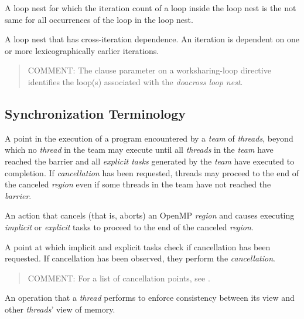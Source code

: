 \glossarydefstart
A loop nest for which the iteration count of a loop inside the loop nest is the
not same for all occurrences of the loop in the loop nest.
\glossarydefend

\glossarydefstart
A loop nest that has cross-iteration dependence. An iteration is dependent 
on one or more lexicographically earlier iterations.
\begin{quote}
COMMENT: The  clause parameter on a worksharing-loop directive identifies 
the loop(s) associated with the \emph{doacross loop nest}.
\end{quote}
\glossarydefend

%
%
\subsection{Synchronization Terminology}
\label{subsec:Synchronization Terminology}
\glossarydefstart
A point in the execution of a program encountered by a \emph{team} 
of \emph{threads}, beyond which no \emph{thread} in the team may 
execute until all \emph{threads} in the \emph{team} have reached 
the barrier and all \emph{explicit tasks} generated by the \emph{team} 
have executed to completion. If \emph{cancellation} has been requested, 
threads may proceed to the end of the canceled \emph{region} even if 
some threads in the team have not reached the \emph{barrier}.
\glossarydefend

\glossarydefstart
An action that cancels (that is, aborts) an OpenMP \emph{region} and 
causes executing \emph{implicit} or \emph{explicit} tasks to proceed 
to the end of the canceled \emph{region}.
\glossarydefend

\glossarydefstart
A point at which implicit and explicit tasks check if cancellation has been
requested. If cancellation has been observed, they perform the \emph{cancellation}.

\begin{quote}
COMMENT: For a list of cancellation points, see .
\end{quote}
\glossarydefend
\bigskip

\glossarydefstart
An operation that a \emph{thread} performs to enforce consistency between its
view and other \emph{threads}' view of memory.
\glossarydefend

